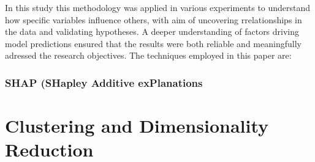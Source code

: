 In this study this methodology was applied in various experiments to understand
how specific variables influence others, with aim of uncovering rrelationships
in the data and validating hypotheses. A deeper  understanding of factors
driving model predictions ensured that the results were both reliable and
meaningfully adressed the research objectives. The  techniques employed in this paper are: 

\subsubsection*{SHAP (SHapley Additive exPlanations}


\section{Clustering and Dimensionality Reduction}
\label{sec:clusteringanddimensionalityreduction}


